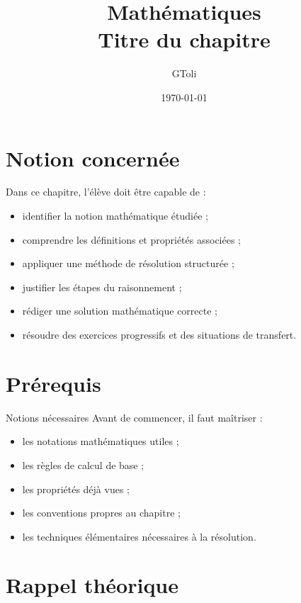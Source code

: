\documentclass[11pt,a4paper]{article}
\title{\textbf{Mathématiques}\\[0.2cm]
\large Titre du chapitre}
\author{GToli}
\date{\today}
\begin{document}
\maketitle

\section{Notion concernée}

\begin{cadreobjectif}
Dans ce chapitre, l’élève doit être capable de :
\begin{itemize}
    \item identifier la notion mathématique étudiée ;
    \item comprendre les définitions et propriétés associées ;
    \item appliquer une méthode de résolution structurée ;
    \item justifier les étapes du raisonnement ;
    \item rédiger une solution mathématique correcte ;
    \item résoudre des exercices progressifs et des situations de transfert.
\end{itemize}
\end{cadreobjectif}

\section{Prérequis}

\begin{cadregris}{Notions nécessaires}
Avant de commencer, il faut maîtriser :
\begin{itemize}
    \item les notations mathématiques utiles ;
    \item les règles de calcul de base ;
    \item les propriétés déjà vues ;
    \item les conventions propres au chapitre ;
    \item les techniques élémentaires nécessaires à la résolution.
\end{itemize}
\end{cadregris}

\section{Rappel théorique}
\end{document}
